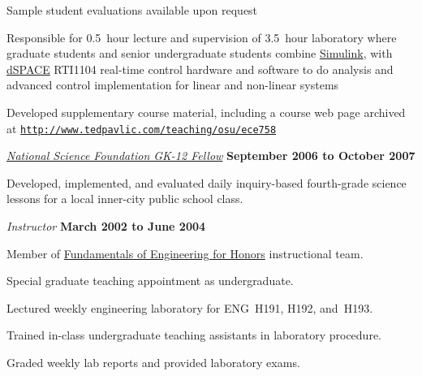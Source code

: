 \documentclass[10pt]{article}
\newenvironment{outerlist}[1][\enskip\textbullet]%
        {\begin{itemize}[#1]}{\end{itemize}%
         \vspace{-.6\baselineskip}}
\newenvironment{innerlist}[1][\enskip\textbullet]%
        {\begin{compactitem}[#1]}{\end{compactitem}}
\providecommand*\url[1]{\href{#1}{#1}}
\renewcommand*\url[1]{\href{#1}{\texttt{#1}}}
\begin{document}
\begin{outerlist}
\begin{innerlist}
\begin{innerlist}
            \item Sample student evaluations available upon request

            \item Responsible for 0.5~hour lecture and supervision of
                3.5~hour laboratory where graduate students and senior
                undergraduate students combine
                \href{http://www.mathworks.com/products/simulink/}{Simulink},
                with \href{http://www.dspaceinc.com/}{dSPACE} RTI1104
                real-time control hardware and software to do analysis
                and advanced control implementation for linear and
                non-linear systems

            \item Developed supplementary course
                material, including a course web page archived at
                \url{http://www.tedpavlic.com/teaching/osu/ece758}
        \end{innerlist}
    \end{innerlist}

\item[] \href{http://www.nsfgk12.org/}
        {\emph{National Science Foundation GK-12 Fellow}}
        \hfill \textbf{September 2006 to October 2007}
\begin{innerlist}
    \item[] Developed, implemented, and evaluated daily inquiry-based
        fourth-grade science lessons for a local inner-city public
        school class.
\end{innerlist}

\item[] \textit{Instructor}%
        \hfill \textbf{March 2002 to June 2004}
\begin{innerlist}
\item Member of \href{http://feh.eng.ohio-state.edu/}
                     {Fundamentals of Engineering for Honors}
      instructional team.
\item Special graduate teaching appointment as undergraduate.
\item Lectured weekly engineering laboratory for ENG~H191,
        H192, and~H193.
\item Trained in-class undergraduate teaching assistants in laboratory
        procedure.
\item Graded weekly lab reports and provided laboratory exams.
\end{innerlist}


\end{outerlist}
\end{document}
